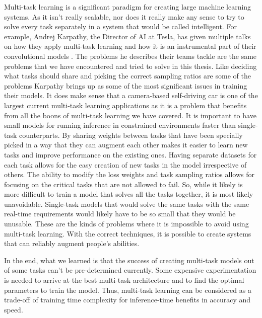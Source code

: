Multi-task learning is a significant paradigm for creating large machine learning systems.
As it isn't really scalable, nor does it really make any sense to try to solve every task separately in a system that would be called intelligent.
For example, Andrej Karpathy, the Director of AI at Tesla, has given multiple talks on how they apply multi-task learning and how it is an instrumental part of their convolutional models \citep{karpathy}.
The problems he describes their teams tackle are the same problems that we have encountered and tried to solve in this thesis.
Like deciding what tasks should share and picking the correct sampling ratios are some of the problems Karpathy brings up as some of the most significant issues in training their models.
It does make sense that a camera-based self-driving car is one of the largest current multi-task learning applications as it is a problem that benefits from all the boons of multi-task learning we have covered.
It is important to have small models for running inference in constrained environments faster than single-task counterparts.
By sharing weights between tasks that have been specially picked in a way that they can augment each other makes it easier to learn new tasks and improve performance on the existing ones.
Having separate datasets for each task allows for the easy creation of new tasks in the model irrespective of others.
The ability to modify the loss weights and task sampling ratios allows for focusing on the critical tasks that are not allowed to fail.
So, while it likely is more difficult to train a model that solves all the tasks together, it is most likely unavoidable.
Single-task models that would solve the same tasks with the same real-time requirements would likely have to be so small that they would be unusable.
These are the kinds of problems where it is impossible to avoid using multi-task learning. 
With the correct techniques, it is possible to create systems that can reliably augment people's abilities.

In the end, what we learned is that the success of creating multi-task models out of some tasks can't be pre-determined currently. 
Some expensive experimentation is needed to arrive at the best multi-task architecture and to find the optimal parameters to train the model.  
Thus, multi-task learning can be considered as a trade-off of training time complexity for inference-time benefits in accuracy and speed.